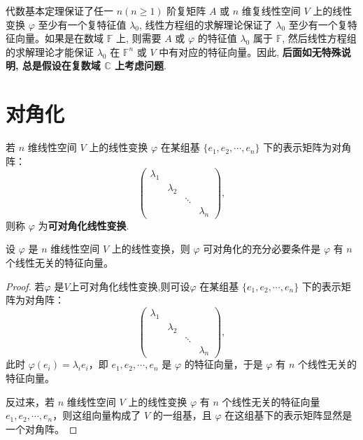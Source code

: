 \documentclass[lang=cn,newtx,10pt,scheme=chinese]{elegantbook}
\begin{document}
\begin{remark}
代数基本定理保证了任一 $n(n \geq 1)$ 阶复矩阵 $A$ 或 $n$ 维复线性空间 $V$ 上的线性变换 $\varphi$ 至少有一个复特征值 $\lambda_0$, 线性方程组的求解理论保证了 $\lambda_0$ 至少有一个复特征向量。如果是在数域 $\mathbb{F}$ 上, 则需要 $A$ 或 $\varphi$ 的特征值 $\lambda_0$ 属于 $\mathbb{F}$, 然后线性方程组的求解理论才能保证 $\lambda_0$ 在 $\mathbb{F}^n$ 或 $V$ 中有对应的特征向量。因此, \textbf{后面如无特殊说明, 总是假设在复数域 $\mathbb{C}$ 上考虑问题}.
\end{remark}




\section{对角化}

\begin{definition}[可对角化线性变换]
若 $n$ 维线性空间 $V$ 上的线性变换 $\varphi$ 在某组基 $\{e_1, e_2, \cdots, e_n\}$ 下的表示矩阵为对角阵：
\[
\begin{pmatrix}
\lambda_1 & & & \\
& \lambda_2 & & \\
& & \ddots & \\
& & & \lambda_n
\end{pmatrix},
\]
则称 $\varphi$ 为\textbf{可对角化线性变换}.
\end{definition}

\begin{theorem}[线性变换可对角化的充要条件]\label{theorem:线性变换可对角化的充要条件}
设 $\varphi$ 是 $n$ 维线性空间 $V$ 上的线性变换，则 $\varphi$ 可对角化的充分必要条件是 $\varphi$ 有 $n$ 个线性无关的特征向量。
\end{theorem}
\begin{proof}
若$\varphi$ 是$V$上可对角化线性变换,则可设$\varphi$ 在某组基 $\{e_1, e_2, \cdots, e_n\}$ 下的表示矩阵为对角阵：
\[
\begin{pmatrix}
\lambda_1 & & & \\
& \lambda_2 & & \\
& & \ddots & \\
& & & \lambda_n
\end{pmatrix},
\]
此时 $\varphi(e_i) = \lambda_i e_i$，即 $e_1, e_2, \cdots, e_n$ 是 $\varphi$ 的特征向量，于是 $\varphi$ 有 $n$ 个线性无关的特征向量。

反过来，若 $n$ 维线性空间 $V$ 上的线性变换 $\varphi$ 有 $n$ 个线性无关的特征向量 $e_1, e_2, \cdots, e_n$，则这组向量构成了 $V$ 的一组基，且 $\varphi$ 在这组基下的表示矩阵显然是一个对角阵。
\end{proof}
\end{document}
